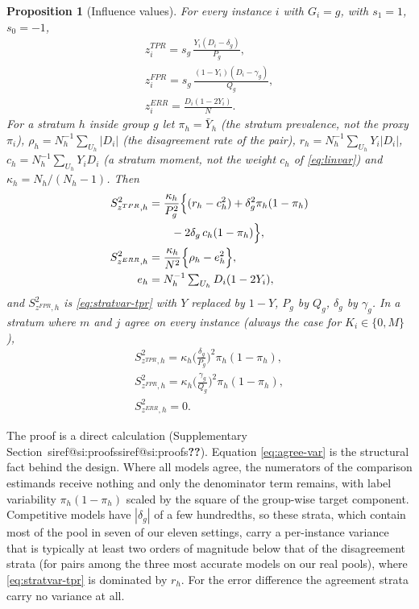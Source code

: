 \documentclass[pdflatex,sn-mathphys-num,iicol]{sn-jnl}
\makeatletter
\theoremstyle{thmstyleone}
\newtheorem{proposition}{Proposition}
\theoremstyle{thmstyletwo}
\theoremstyle{thmstylethree}
\newcommand{\SIref}[1]{\ifcsname siref@#1\endcsname\csname siref@#1\endcsname\else\textbf{??}\fi}
\makeatother
\begin{document}
\begin{proposition}[Influence values]\label{prop:influence}
For every instance $i$ with $G_i=g$, with $s_1=1$, $s_0=-1$,
\begin{equation}\label{eq:infl-forms}
\begin{gathered}
z^{TPR}_i=s_g\,\frac{Y_i(D_i-\delta_g)}{P_g},\\
z^{FPR}_i=s_g\,\frac{(1-Y_i)(D_i-\gamma_g)}{Q_g},\\
z^{ERR}_i=\frac{D_i(1-2Y_i)}{N}.
\end{gathered}
\end{equation}
For a stratum $h$ inside group $g$ let $\pi_h=\bar Y_h$ (the stratum prevalence, not the proxy $\pi_i$), $\rho_h=N_h^{-1}\sum_{U_h}|D_i|$ (the disagreement rate of the pair),
$r_h=N_h^{-1}\sum_{U_h}Y_i|D_i|$, $c_h=N_h^{-1}\sum_{U_h}Y_iD_i$ (a stratum moment, not the weight $c_h$ of \eqref{eq:linvar}) and $\kappa_h=N_h/(N_h-1)$. Then
\begin{align}
S^2_{z^{TPR},h}&=\frac{\kappa_h}{P_g^2}\Big\{(r_h-c_h^2)+\delta_g^2\pi_h(1-\pi_h)\notag\\
&\qquad{}-2\delta_g\,c_h(1-\pi_h)\Big\},\label{eq:stratvar-tpr}\\
S^2_{z^{ERR},h}&=\frac{\kappa_h}{N^2}\Big\{\rho_h-e_h^2\Big\},\notag\\
e_h&=N_h^{-1}\textstyle\sum_{U_h}D_i(1-2Y_i),\label{eq:stratvar-err}
\end{align}
and $S^2_{z^{FPR},h}$ is \eqref{eq:stratvar-tpr} with $Y$ replaced by $1-Y$, $P_g$ by $Q_g$, $\delta_g$ by $\gamma_g$. In a stratum
where $m$ and $j$ agree on every instance (always the case for $K_i\in\{0,M\}$),
\begin{equation}\label{eq:agree-var}
\begin{gathered}
S^2_{z^{TPR},h}=\kappa_h\Big(\frac{\delta_g}{P_g}\Big)^2\pi_h(1-\pi_h),\\
S^2_{z^{FPR},h}=\kappa_h\Big(\frac{\gamma_g}{Q_g}\Big)^2\pi_h(1-\pi_h),\\
S^2_{z^{ERR},h}=0 .
\end{gathered}
\end{equation}
\end{proposition}

The proof is a direct calculation (Supplementary Section~\SIref{si:proofs}). Equation \eqref{eq:agree-var} is the structural fact behind the
design. Where all models agree, the numerators of the comparison estimands receive nothing and only the denominator term remains, with label
variability $\pi_h(1-\pi_h)$ scaled by the square of the group-wise target component. Competitive models have $|\delta_g|$ of a few hundredths,
so these strata, which contain most of the pool in seven of our eleven settings, carry a per-instance variance that is typically at least two orders of magnitude below that of the disagreement strata (for pairs among the three most accurate models on our real pools),
where \eqref{eq:stratvar-tpr} is dominated by $r_h$. For the error difference the agreement strata carry no variance at all.
\end{document}
